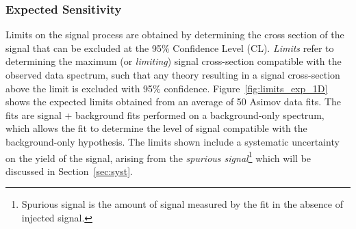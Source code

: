 \clearpage
\subsubsection{Expected Sensitivity}
\label{subsec:fit_expsens}

Limits on the signal process are obtained by determining the cross section of the signal that can be excluded at the 95\% Confidence Level (CL). 
\textit{Limits} refer to determining the maximum (or \textit{limiting}) signal cross-section compatible with the observed data spectrum, such that any theory resulting in a signal cross-section above the limit is excluded with 95\% confidence. 
Figure~\ref{fig:limits_exp_1D} shows the expected limits obtained from an average of 50 Asimov data fits. 
The fits are signal + background fits performed on a background-only spectrum, which allows the fit to determine the level of signal compatible with the background-only hypothesis.
The limits shown include a systematic uncertainty on the yield of the signal, arising from the \textit{spurious signal}\footnote{Spurious signal is the amount of signal measured by the fit in the absence of injected signal.} which will be discussed in Section~\ref{sec:syst}.

